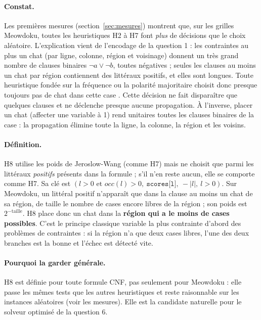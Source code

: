 \documentclass[11pt,a4paper]{article}
\begin{document}
\paragraph{Constat.} Les premières mesures (section~\ref{sec:mesures})
montrent que, sur les grilles Meowdoku, toutes les heuristiques H2 à H7 font
\emph{plus} de décisions que le choix aléatoire. L'explication vient de
l'encodage de la question 1 : les contraintes \og au plus un chat \fg{} (par
ligne, colonne, région et voisinage) donnent un très grand nombre de clauses
binaires $\lnot a \lor \lnot b$, toutes négatives ; seules les clauses
\og au moins un chat par région \fg{} contiennent des littéraux positifs, et
elles sont longues. Toute heuristique fondée sur la fréquence ou la
polarité majoritaire choisit donc presque toujours \og pas de chat dans
cette case \fg{}. Cette décision ne fait disparaître que quelques clauses et
ne déclenche presque aucune propagation. À l'inverse, placer un chat
(affecter une variable à 1) rend unitaires toutes les clauses binaires de la
case : la propagation élimine toute la ligne, la colonne, la région et les
voisins.

\paragraph{Définition.} H8 utilise les poids de Jeroslow-Wang (comme H7)
mais ne choisit que parmi les littéraux \emph{positifs} présents dans la
formule ; s'il n'en reste aucun, elle se comporte comme H7. Sa clé est
$(l > 0 \text{ et } occ(l) > 0,\ \texttt{scores[l]},\ -|l|,\ l > 0)$.
Sur Meowdoku, un littéral positif n'apparaît que dans la clause \og au moins
un chat \fg{} de sa région, de taille le nombre de cases encore libres de la
région ; son poids est $2^{-\text{taille}}$. H8 place donc un chat dans la
\textbf{région qui a le moins de cases possibles}. C'est le principe
classique \og variable la plus contrainte d'abord \fg{} des problèmes de
contraintes : si la région n'a que deux cases libres, l'une des deux
branches est la bonne et l'échec est détecté vite.

\paragraph{Pourquoi la garder générale.} H8 est définie pour toute formule
CNF, pas seulement pour Meowdoku : elle passe les mêmes tests que les autres
heuristiques et reste raisonnable sur les instances aléatoires (voir les
mesures). Elle est la candidate naturelle pour le solveur optimisé de la
question 6.
\end{document}

